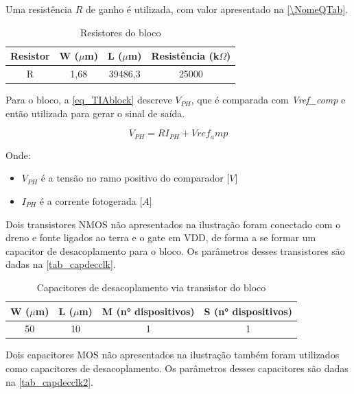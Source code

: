 Uma resist\^encia $R$ de ganho \'e utilizada, com valor apresentado na \autoref{\NomeQTab}.

\begin{table}[htb]
\caption{Resistores do bloco \NomeBloco}
\label{\NomeQTab}
\centering
\begin{tabular}{cccc}
\toprule
Resistor & W ($\mu$m)  & L ($\mu$m) & Resist\^encia (k$\Omega$)\\
\midrule \midrule
R & 1,68 & 39486,3 & 25000\\
\bottomrule
\end{tabular}
\end{table}

Para o bloco, a \autoref{eq_TIAblock} descreve $V_{PH}$, que \'e comparada com \emph{Vref\_comp} e ent\~ao utilizada para gerar o sinal de sa\'ida.

\begin{equation}
    \label{eq_TIAblock}
    V_{PH} = RI_{PH} + Vref_amp
\end{equation}

Onde:

\begin{itemize}

    \item \emph{$V_{PH}$} \'e a tens\~ao no ramo positivo do comparador [$V$]
    \item \emph{$I_{PH}$} \'e a corrente fotogerada [$A$]
    
\end{itemize}

Dois transistores NMOS n\~ao apresentados na ilustra{\c c}\~ao foram conectado com o dreno e fonte ligados ao terra e o gate em VDD, de forma a se formar um capacitor de desacoplamento para o bloco. Os par\^ametros desses transistores s\~ao dadas na \autoref{tab_capdecclk}.

\begin{table}[htbp]
\caption{Capacitores de desacoplamento via transistor do bloco \NomeBloco}
\label{tab_capdecclk}
\centering
\begin{tabular}{cccc}
\toprule
W ($\mu$m)  & L ($\mu$m) & M (n° dispositivos) & S (n° dispositivos)\\
\midrule \midrule
50 & 10 & 1 & 1\\
\bottomrule
\end{tabular}
\end{table}

Dois capacitores MOS n\~ao apresentados na ilustra{\c c}\~ao tamb\'em foram utilizados como capacitores de desacoplamento. Os par\^ametros desses capacitores s\~ao dadas na \autoref{tab_capdecclk2}.

